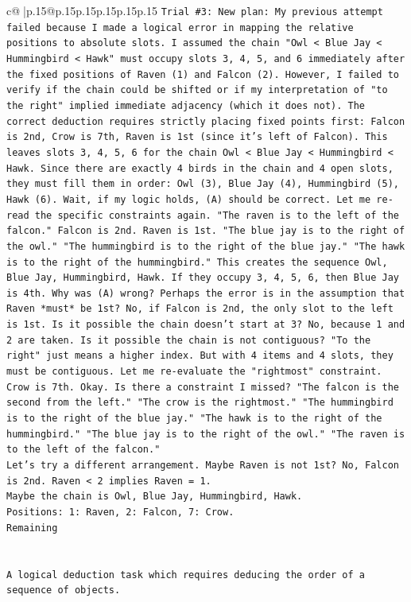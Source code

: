 \documentclass{article}
\begin{document}
{\begin{supertabular}{c@{$\;$}|p{.15\linewidth}@{}p{.15\linewidth}p{.15\linewidth}p{.15\linewidth}p{.15\linewidth}p{.15\linewidth}}
{{{\texttt{Trial \#3: New plan: My previous attempt failed because I made a logical error in mapping the relative positions to absolute slots. I assumed the chain "Owl < Blue Jay < Hummingbird < Hawk" must occupy slots 3, 4, 5, and 6 immediately after the fixed positions of Raven (1) and Falcon (2). However, I failed to verify if the chain could be shifted or if my interpretation of "to the right" implied immediate adjacency (which it does not). The correct deduction requires strictly placing fixed points first: Falcon is 2nd, Crow is 7th, Raven is 1st (since it's left of Falcon). This leaves slots 3, 4, 5, 6 for the chain Owl < Blue Jay < Hummingbird < Hawk. Since there are exactly 4 birds in the chain and 4 open slots, they must fill them in order: Owl (3), Blue Jay (4), Hummingbird (5), Hawk (6). Wait, if my logic holds, (A) should be correct. Let me re{-}read the specific constraints again. "The raven is to the left of the falcon." Falcon is 2nd. Raven is 1st. "The blue jay is to the right of the owl." "The hummingbird is to the right of the blue jay." "The hawk is to the right of the hummingbird." This creates the sequence Owl, Blue Jay, Hummingbird, Hawk. If they occupy 3, 4, 5, 6, then Blue Jay is 4th. Why was (A) wrong? Perhaps the error is in the assumption that Raven *must* be 1st? No, if Falcon is 2nd, the only slot to the left is 1st. Is it possible the chain doesn't start at 3? No, because 1 and 2 are taken. Is it possible the chain is not contiguous? "To the right" just means a higher index. But with 4 items and 4 slots, they must be contiguous. Let me re{-}evaluate the "rightmost" constraint. Crow is 7th. Okay. Is there a constraint I missed? "The falcon is the second from the left." "The crow is the rightmost." "The hummingbird is to the right of the blue jay." "The hawk is to the right of the hummingbird." "The blue jay is to the right of the owl." "The raven is to the left of the falcon."} \\
\texttt{Let's try a different arrangement. Maybe Raven is not 1st? No, Falcon is 2nd. Raven < 2 implies Raven = 1.} \\
\texttt{Maybe the chain is Owl, Blue Jay, Hummingbird, Hawk.} \\
\texttt{Positions: 1: Raven, 2: Falcon, 7: Crow.} \\
\texttt{Remaining} \\
\\ 
\\ 
\texttt{A logical deduction task which requires deducing the order of a sequence of objects.} \\
}}}
\end{supertabular}}
\end{document}
